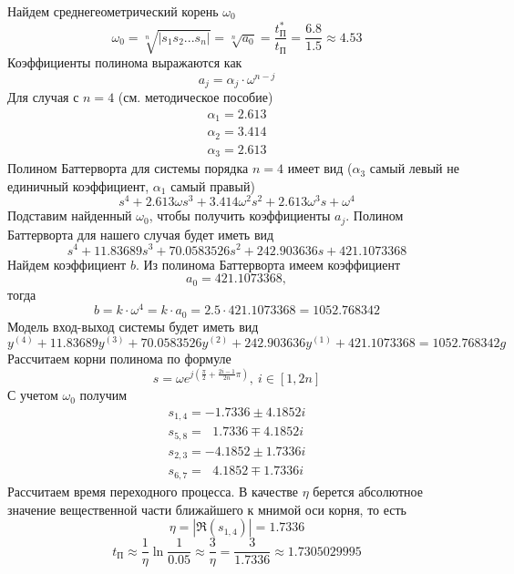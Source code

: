 \documentclass[a4paper, 12pt]{article}
\begin{document}
    \noindent Найдем среднегеометрический корень $\omega_0$
    $$\omega_0=\sqrt[n]{|s_1s_2...s_n|}=\sqrt[n]{a_0}=\dfrac{t^*_{\text{П}}}{t_{\text{П}}}=\dfrac{6.8}{1.5}\approx4.53$$
    Коэффициенты полинома выражаются как
    $$a_j=\alpha_j\cdot\omega^{n-j}$$
    Для случая с $n=4$ (см. методическое пособие)
    $$
    \begin{matrix}
    \alpha_1=2.613\\
    \alpha_2=3.414\\
    \alpha_3=2.613
    \end{matrix}
    $$
    Полином Баттерворта для системы порядка $n=4$ имеет вид ($\alpha_3$ самый левый не единичный коэффициент, $\alpha_1$ самый правый)
    $$s^4+2.613\omega s^3+3.414\omega^2s^2+2.613\omega^3s+\omega^4$$
    Подставим найденный $\omega_0$, чтобы получить коэффициенты $a_j$. Полином Баттерворта для нашего случая будет иметь вид
    $$s^4+11.83689s^3+70.0583526s^2+242.903636s+421.1073368$$
    Найдем коэффициент $b$. Из полинома Баттерворта имеем коэффициент $$a_0=421.1073368,$$
    тогда $$b=k\cdot\omega^4=k\cdot a_0=2.5\cdot421.1073368=1052.768342$$
    Модель вход-выход системы будет иметь вид
    $$y^{(4)}+11.83689y^{(3)}+70.0583526y^{(2)}+242.903636y^{(1)}+421.1073368=1052.768342g$$
    Рассчитаем корни полинома по формуле
    $$s=\omega e^{j\left(\frac{\pi}{2}+\frac{2i-1}{2n}\pi\right)},\ i\in[1,2n]$$
    С учетом $\omega_0$ получим
    $$
    \begin{matrix}
    s_{1,4}=-1.7336\pm4.1852i\\
    s_{5,8}=\ \ \, 1.7336\mp4.1852i\\
    s_{2,3}=-4.1852\pm1.7336i\\
    s_{6,7}=\ \ \, 4.1852\mp1.7336i
    \end{matrix}
    $$
    Рассчитаем время переходного процесса. В качестве $\eta$ берется абсолютное значение вещественной части
    ближайшего к мнимой оси корня, то есть $$\eta=|\Re{\left(s_{1,4}\right)}|=1.7336$$
    $$t_{\text{П}}\approx\dfrac{1}{\eta}\ln{\dfrac{1}{0.05}}\approx\dfrac{3}{\eta}=\dfrac{3}{1.7336}\approx1.7305029995$$
\end{document}
